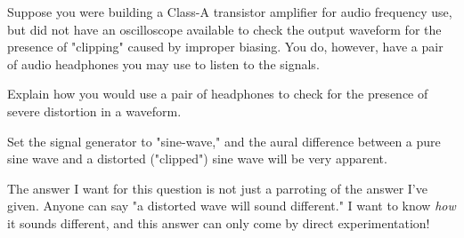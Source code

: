 

Suppose you were building a Class-A transistor amplifier for audio frequency use, but did not have an oscilloscope available to check the output waveform for the presence of "clipping" caused by improper biasing.  You do, however, have a pair of audio headphones you may use to listen to the signals.

Explain how you would use a pair of headphones to check for the presence of severe distortion in a waveform.







Set the signal generator to "sine-wave," and the aural difference between a pure sine wave and a distorted ("clipped") sine wave will be very apparent.







The answer I want for this question is not just a parroting of the answer I've given.  Anyone can say "a distorted wave will sound different."  I want to know {\it how} it sounds different, and this answer can only come by direct experimentation!



